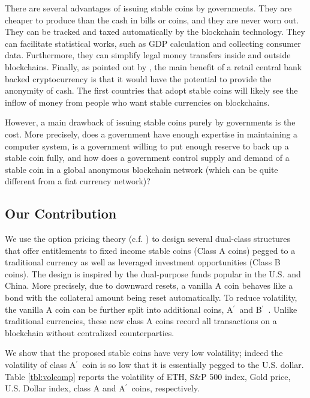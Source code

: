 \documentclass[11pt]{article}%
\numberwithin{equation}{section}
\theoremstyle{plain}
\newcommand{\Ap}{A\ensuremath{^\prime}~}
\newcommand{\Bp}{B\ensuremath{^\prime}~}
\begin{document}
There are several advantages of issuing stable coins by governments. They are cheaper to produce than the cash in bills or coins, and they are never worn out. They can be tracked and taxed automatically by the blockchain technology. They can facilitate statistical works, such as GDP calculation and collecting consumer data. Furthermore, they can simplify legal money transfers inside and outside blockchains. Finally, as pointed out by \cite{bech_central_2017}, the main benefit of a retail central bank backed cryptocurrency is that it would have the potential to provide the anonymity of cash. The first countries that adopt stable coins will likely see the inflow of money from people who want stable currencies on blockchains.

However, a main drawback of issuing stable coins purely by governments is the cost. More precisely, does a government have enough expertise in maintaining a computer system, is a government willing to put enough reserve to back up a stable coin fully, and  how does a government control supply and demand of a stable coin in a global anonymous blockchain network (which can be quite different from a fiat currency network)?



\subsection{Our Contribution}

We use the option pricing theory (c.f. \cite{duffie_dynamic_2010,hull_options_2017,ingersoll_theory_1987,jarrow_derivative_1999,shreve_stochastic_2004}) to design several dual-class structures that offer entitlements to fixed income stable coins (Class A coins) pegged to a traditional currency as well as leveraged investment opportunities (Class B coins).  The design is inspired by the dual-purpose funds popular in the U.S. and China. More precisely, due to downward resets, a vanilla A coin behaves like a bond with the collateral amount being reset automatically. To reduce volatility, the vanilla A coin can be further split into additional coins, \Ap and \Bp. Unlike traditional currencies, these new class A coins record all transactions on a blockchain without centralized counterparties.

We show that the proposed stable coins have very low volatility; indeed the volatility of class \Ap coin is so low that it is essentially pegged to the U.S. dollar.
Table \ref{tbl:volcomp} reports the volatility of ETH, S\&P 500 index, Gold price, U.S. Dollar index, class A and \Ap coins, respectively.
\end{document}

